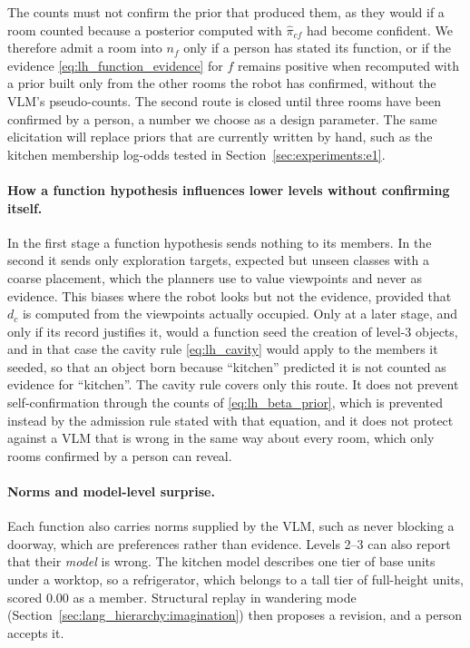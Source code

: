 The counts must not confirm the prior that produced them, as they would if a room counted because a posterior
computed with $\hat\pi_{cf}$ had become confident. We therefore admit a room into $n_f$ only if a person has stated its
function, or if the evidence \eqref{eq:lh_function_evidence} for $f$ remains positive when recomputed with a prior
built only from the other rooms the robot has confirmed, without the VLM's pseudo-counts. The second route is closed
until three rooms have been confirmed by a person, a number we choose as a design parameter. The same elicitation will replace priors that are currently written
by hand, such as the kitchen membership log-odds tested in Section~\ref{sec:experiments:e1}.

\paragraph{How a function hypothesis influences lower levels without confirming itself.}
In the first stage a function hypothesis sends nothing to its members. In the second it sends only exploration
targets, expected but unseen classes with a coarse placement, which the planners use to value viewpoints and never as
evidence. This biases where the robot looks but not the evidence, provided that $d_c$ is computed from the viewpoints
actually occupied. Only at a later stage, and only if its record justifies it, would a function seed the creation of level-3 objects,
and in that case the cavity rule \eqref{eq:lh_cavity} would apply to the members it seeded, so that an object born
because ``kitchen'' predicted it is not counted as evidence for ``kitchen''. The cavity rule covers only this route.
It does not prevent self-confirmation through the counts of \eqref{eq:lh_beta_prior}, which is prevented instead by
the admission rule stated with that equation, and it does not protect against a VLM that is wrong in the same way
about every room, which only rooms confirmed by a person can reveal.

\paragraph{Norms and model-level surprise.}
Each function also carries norms supplied by the VLM, such as never blocking a doorway, which are preferences
rather than evidence. Levels 2--3 can also report that their \emph{model} is wrong. The kitchen model describes one
tier of base units under a worktop, so a refrigerator, which belongs to a tall tier of full-height units, scored
$0.00$ as a member. Structural replay in wandering mode (Section~\ref{sec:lang_hierarchy:imagination}) then proposes a revision, and a person accepts it.

